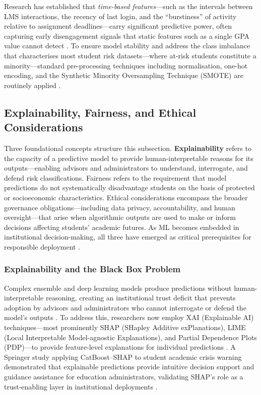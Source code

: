 \documentclass[12pt]{report}
\begin{document}
Research has established that \textit{time-based features}---such as
the intervals between LMS interactions, the recency of last login, and
the ``burstiness'' of activity relative to assignment deadlines---carry
significant predictive power, often capturing early disengagement signals
that static features such as a single GPA value cannot detect
\parencite{Dirin2022}. To ensure model stability and address the class
imbalance that characterises most student risk datasets---where at-risk
students constitute a minority---standard pre-processing techniques
including normalisation, one-hot encoding, and the Synthetic Minority
Oversampling Technique (SMOTE) are routinely applied
\parencite{bello2025, aldowah2026}.

\subsection{Explainability, Fairness, and Ethical Considerations}

Three foundational concepts structure this subsection.
\textbf{Explainability} refers to the capacity of a predictive model
to provide human-interpretable reasons for its outputs---enabling
advisors and administrators to understand, interrogate, and defend
risk classifications. Fairness refers to the requirement that
model predictions do not systematically disadvantage students on the
basis of protected or socioeconomic characteristics. Ethical
considerations encompass the broader governance obligations---including
data privacy, accountability, and human oversight---that arise when
algorithmic outputs are used to make or inform decisions affecting
students' academic futures. As ML becomes embedded in institutional
decision-making, all three have emerged as critical prerequisites for
responsible deployment \parencite{kwakye2025, bello2025}.

\subsubsection{Explainability and the Black Box Problem}
Complex ensemble and deep learning models produce predictions without
human-interpretable reasoning, creating an institutional trust deficit
that prevents adoption by advisors and administrators who cannot
interrogate or defend the model's outputs \parencite{kwakye2025}.
To address this, researchers now employ XAI (Explainable AI)
techniques---most prominently SHAP (SHapley Additive exPlanations),
LIME (Local Interpretable Model-agnostic Explanations), and Partial
Dependence Plots (PDP)---to provide feature-level explanations for
individual predictions \parencite{kwakye2025}. A Springer study
applying CatBoost--SHAP to student academic crisis warning demonstrated
that explainable predictions provide intuitive decision support and
guidance assistance for education administrators, validating SHAP's
role as a trust-enabling layer in institutional deployments
\parencite{zhang2021}.
\end{document}
